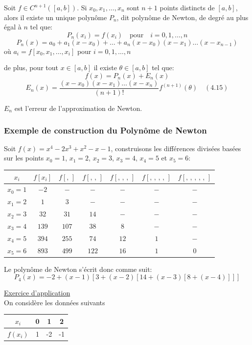 \begin{theoreme}
	Soit $f \in C^{n+1}([a, b])$. Si $x_0, x_1, \ldots, x_n$ sont $n+1$ points distincts de $[a, b]$, alors il existe un unique polynôme $P_n$, dit polynôme de Newton, de degré au plus égal à $n$ tel que:
	\[
	P_n(x_i) = f(x_i) \quad \text{pour} \quad i = 0, 1, \ldots, n
	\]
	\[
	P_n(x) = a_0 + a_1(x-x_0) + \ldots + a_n(x-x_0)(x-x_1)\ldots(x-x_{n-1})
	\]
	où $a_i = f[x_0,x_1,\ldots,x_i]$ pour $i = 0, 1, \ldots, n$
	
	de plus, pour tout $x \in [a, b]$ il existe $\theta \in [a, b]$ tel que:
	\[
	f(x) = P_n(x) + E_n(x)
	\]
	\[
	E_n(x) = \frac{(x-x_0)(x-x_1)\ldots(x-x_n)}{(n+1)!} f^{(n+1)}(\theta) \quad (4.15)
	\]
	
	$E_n$ est l'erreur de l'approximation de Newton.
\end{theoreme}

\subsubsection{Exemple de construction du Polynôme de Newton}

Soit $f(x) = x^4 - 2x^3 + x^2 - x - 1$, construisons les différences divisées basées sur les points $x_0 = 1$, $x_1 = 2$, $x_2 = 3$, $x_3 = 4$, $x_4 = 5$ et $x_5 = 6$:

\begin{table}[h]
	\centering
	\begin{tabular}{c|c|c|c|c|c|c}
		$x_i$ & $f[x_i]$ & $f[,\,]$ & $f[,\,,\,]$ & $f[,\,,\,,\,]$ & $f[,\,,\,,\,,\,]$ & $f[,\,,\,,\,,\,,\,]$ \\
		\hline
		$x_0 = 1$ & $-2$ & $-$ & $-$ & $-$ & $-$ & $-$ \\
		$x_1 = 2$ & $1$ & $3$ & $-$ & $-$ & $-$ & $-$ \\
		$x_2 = 3$ & $32$ & $31$ & $14$ & $-$ & $-$ & $-$ \\
		$x_3 = 4$ & $139$ & $107$ & $38$ & $8$ & $-$ & $-$ \\
		$x_4 = 5$ & $394$ & $255$ & $74$ & $12$ & $1$ & $-$ \\
		$x_5 = 6$ & $893$ & $499$ & $122$ & $16$ & $1$ & $0$
	\end{tabular}
\end{table}

Le polynôme de Newton s'écrit donc comme suit:
\[
P_4(x) = -2 + (x-1)[3 + (x-2)[14 + (x-3)[8 + (x-4)]]]
\]

\underline{Exercice d'application}\\
On considère les données suivants\\
\begin{tabular}{|c|c|c|c|}
	\hline
	$x_{i}$&0&1&2\\
	\hline
	$f(x_{i})$&1&-2&-1\\
	\hline
\end{tabular}\\

